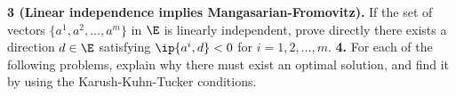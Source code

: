 \documentclass[../borwein-lewis_notes.tex]{subfiles}
\begin{document}
\textbf{3 (Linear independence implies Mangasarian-Fromovitz).} If 
the set of vectors $\{a^1,a^2,\ldots, a^m\}$ in $\E$ is linearly 
independent, prove directly there exists a direction $d\in\E$ satisfying 
$\ip{a^i, d}<0$ for $i=1,2,\ldots, m$. 
\noindent
\textbf{4.} For each of the following problems, explain why there must 
exist an optimal solution, and find it by using the Karush-Kuhn-Tucker
conditions.
\end{document}
